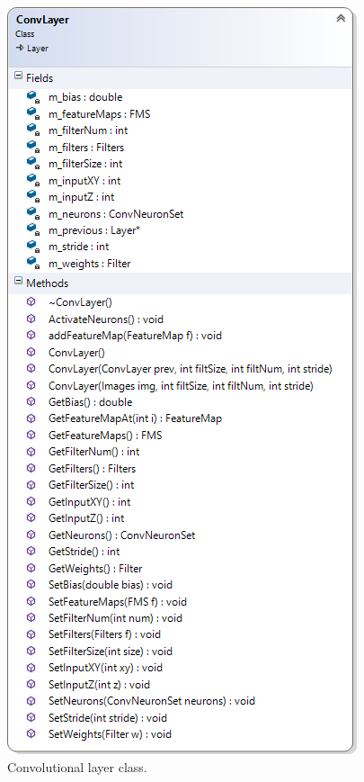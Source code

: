 \documentclass[10pt]{article}
\begin{document}
		\begin{figure}[h]
			\centering
			\includegraphics[scale=0.8]{img/classConvLayer}
			\caption{Convolutional layer class.}
			\label{fig:convlcd}				
		\end{figure}
\end{document}

